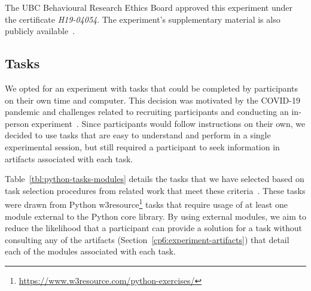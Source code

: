 





The \acs{UBC} Behavioural Research Ethics Board approved this experiment under the certificate \textit{H19-04054}.
The experiment's supplementary material is also publicly available~\cite{dspython}.



\subsection{Tasks}
\label{cp6:tasks}


We opted for an experiment with tasks that could be completed by participants on their own time and computer.
This decision was motivated by the COVID-19 pandemic and challenges related to recruiting participants and conducting an in-person experiment~\cite{russo2021a, russo2021b}. 
Since participants would follow instructions on their own, we decided to use tasks that are easy to understand and perform in a single experimental session, but still required a participant  
to seek information in artifacts associated with each task.


Table~\ref{tbl:python-tasks-modules} details the tasks that we have selected based on task selection procedures from related work that meet these criteria~\cite{thiselton2019}. 
These tasks were drawn from
Python w3resource\footnote{\url{https://www.w3resource.com/python-exercises/}} tasks
that require usage of at least one module external to the Python core library.
By using external modules, we aim to reduce the likelihood that a participant 
can provide a solution for a task without consulting any of the artifacts (Section~\ref{cp6:experiment-artifacts})
that detail each of the modules associated with each task. 


